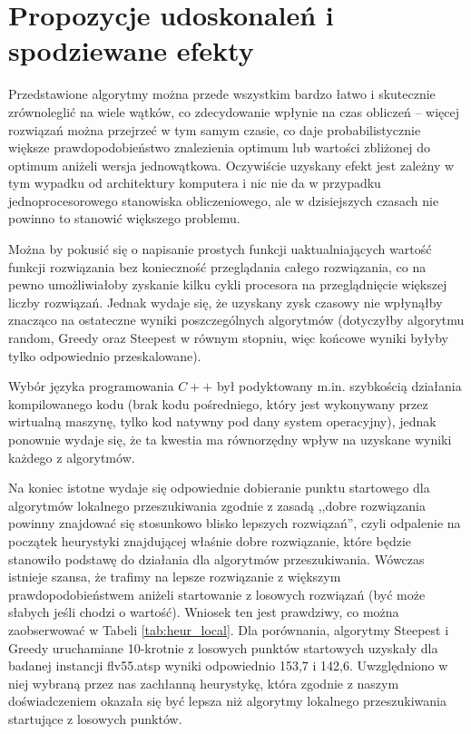 \section{Propozycje udoskonaleń i spodziewane efekty}
Przedstawione algorytmy można przede wszystkim bardzo łatwo i skutecznie zrównoleglić na wiele wątków, co zdecydowanie wpłynie na czas obliczeń -- więcej rozwiązań można przejrzeć w tym samym czasie, co daje probabilistycznie większe prawdopodobieństwo znalezienia optimum lub wartości zbliżonej do optimum aniżeli wersja jednowątkowa. Oczywiście uzyskany efekt jest zależny w tym wypadku od architektury komputera i nic nie da w przypadku jednoprocesorowego stanowiska obliczeniowego, ale w dzisiejszych czasach nie powinno to stanowić większego problemu.

Można by pokusić się o napisanie prostych funkcji uaktualniających wartość funkcji rozwiązania bez konieczność przeglądania całego rozwiązania, co na pewno umożliwiałoby zyskanie kilku cykli procesora na przeglądnięcie większej liczby rozwiązań. Jednak wydaje się, że uzyskany zysk czasowy nie wpłynąłby znacząco na ostateczne wyniki poszczególnych algorytmów (dotyczyłby algorytmu random, Greedy oraz Steepest w równym stopniu, więc końcowe wyniki byłyby tylko odpowiednio przeskalowane).

Wybór języka programowania $C++$ był podyktowany m.in. szybkością działania kompilowanego kodu (brak kodu pośredniego, który jest wykonywany przez wirtualną maszynę, tylko kod natywny pod dany system operacyjny), jednak ponownie wydaje się, że ta kwestia ma równorzędny wpływ na uzyskane wyniki każdego z algorytmów.

Na koniec istotne wydaje się odpowiednie dobieranie punktu startowego dla algorytmów lokalnego przeszukiwania zgodnie z zasadą ,,dobre rozwiązania powinny znajdować się stosunkowo blisko lepszych rozwiązań'', czyli odpalenie na początek heurystyki znajdującej właśnie dobre rozwiązanie, które będzie stanowiło podstawę do działania dla algorytmów przeszukiwania. Wówczas istnieje szansa, że trafimy na lepsze rozwiązanie z większym prawdopodobieństwem aniżeli startowanie z losowych rozwiązań (być może słabych jeśli chodzi o wartość). Wniosek ten jest prawdziwy, co można zaobserwować w Tabeli \ref{tab:heur_local}. Dla porównania, algorytmy Steepest i Greedy uruchamiane 10-krotnie z losowych punktów startowych uzyskały dla badanej instancji flv55.atsp wyniki odpowiednio 153,7 i 142,6. Uwzględniono w niej wybraną przez nas zachłanną heurystykę, która zgodnie z naszym doświadczeniem okazała się być lepsza niż algorytmy lokalnego przeszukiwania startujące z losowych punktów.


